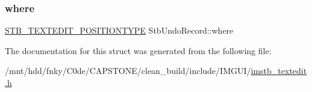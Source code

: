 \subsubsection{\texorpdfstring{where}{where}}
{\footnotesize\ttfamily \hyperlink{imstb__textedit_8h_a5d0c1b8751b6517e3d817f2a025ed654}{S\+T\+B\+\_\+\+T\+E\+X\+T\+E\+D\+I\+T\+\_\+\+P\+O\+S\+I\+T\+I\+O\+N\+T\+Y\+PE} Stb\+Undo\+Record\+::where}



The documentation for this struct was generated from the following file\+:\begin{DoxyCompactItemize}
\item 
/mnt/hdd/fnky/\+C0de/\+C\+A\+P\+S\+T\+O\+N\+E/clean\+\_\+build/include/\+I\+M\+G\+U\+I/\hyperlink{imstb__textedit_8h}{imstb\+\_\+textedit.\+h}\end{DoxyCompactItemize}
